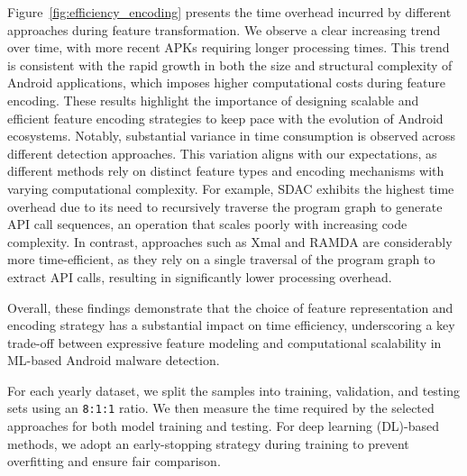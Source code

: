Figure~\ref{fig:efficiency_encoding} presents the time overhead incurred by different approaches during feature transformation. We observe a clear increasing trend over time, with more recent APKs requiring longer processing times. This trend is consistent with the rapid growth in both the size and structural complexity of Android applications, which imposes higher computational costs during feature encoding. These results highlight the importance of designing scalable and efficient feature encoding strategies to keep pace with the evolution of Android ecosystems.
Notably, substantial variance in time consumption is observed across different detection approaches. This variation aligns with our expectations, as different methods rely on distinct feature types and encoding mechanisms with varying computational complexity. For example, SDAC exhibits the highest time overhead due to its need to recursively traverse the program graph to generate API call sequences, an operation that scales poorly with increasing code complexity. In contrast, approaches such as Xmal and RAMDA are considerably more time-efficient, as they rely on a single traversal of the program graph to extract API calls, resulting in significantly lower processing overhead.

Overall, these findings demonstrate that the choice of feature representation and encoding strategy has a substantial impact on time efficiency, underscoring a key trade-off between expressive feature modeling and computational scalability in ML-based Android malware detection.

For each yearly dataset, we split the samples into training, validation, and testing sets using an \texttt{8:1:1} ratio. We then measure the time required by the selected approaches for both model training and testing. For deep learning (DL)-based methods, we adopt an early-stopping strategy during training to prevent overfitting and ensure fair comparison.

